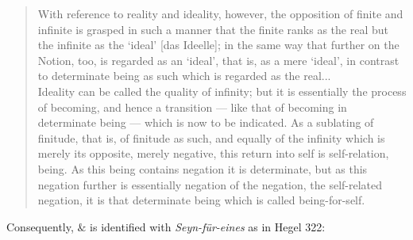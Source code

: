 \documentclass{article}
\begin{document}
\begin{quote}
    With reference to reality and ideality, however, the opposition of finite and infinite is grasped in such a manner that the finite ranks as the real but the infinite as the ‘ideal’ [das Ideelle]; in the same way that further on the Notion, too, is regarded as an ‘ideal’, that is, as a mere ‘ideal’, in contrast to determinate being as such which is regarded as the real... \\
    
    Ideality can be called the quality of infinity; but it is essentially the process of becoming, and hence a transition — like that of becoming in determinate being — which is now to be indicated. As a sublating of finitude, that is, of finitude as such, and equally of the infinity which is merely its opposite, merely negative, this return into self is self-relation, being. As this being contains negation it is determinate, but as this negation further is essentially negation of the negation, the self-related negation, it is that determinate being which is called being-for-self.
\end{quote}

Consequently, $\&$ is identified with \emph{Seyn-für-eines} as in Hegel 322:
\end{document}
